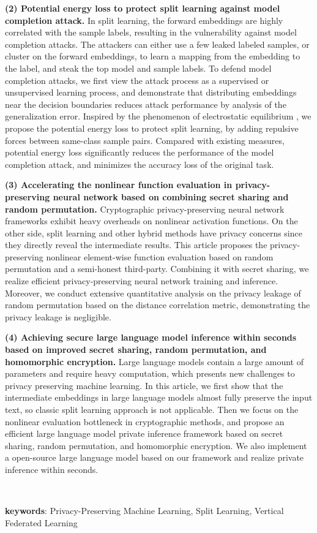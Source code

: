 \textbf{(2) Potential energy loss to protect split learning against model completion attack.}
In split learning, the forward embeddings are highly correlated with the sample labels, resulting in the vulnerability against model completion attacks.
%
The attackers can either use a few leaked labeled samples, or cluster on the forward embeddings, to learn a mapping from the embedding to the label, and steak the top model and sample labels.
%
To defend model completion attacks, we first view the attack process as a supervised or unsupervised learning process, and demonstrate that distributing embeddings near the decision boundaries reduces attack performance by analysis of the generalization error.
%
Inspired by the phenomenon of electrostatic equilibrium , we propose the potential energy loss to protect split learning, by adding repulsive forces between same-class sample pairs.
%
Compared with existing measures, potential energy loss significantly reduces the performance of the model completion attack, and minimizes the accuracy loss of the original task.


\textbf{(3) Accelerating the nonlinear function evaluation in privacy-preserving neural network based on combining secret sharing and random permutation.}
Cryptographic privacy-preserving neural network frameworks exhibit heavy overheads on nonlinear activation functions.
On the other side, split learning and other hybrid methods have privacy concerns since they directly reveal the intermediate results.
%
This article proposes the privacy-preserving nonlinear element-wise function evaluation based on random permutation and a semi-honest third-party.
%
Combining it with secret sharing, we realize efficient privacy-preserving neural network training and inference.
%
Moreover, we conduct extensive quantitative analysis on the privacy leakage of random permutation based on the distance correlation metric, demonstrating the privacy leakage is negligible.

\textbf{(4) Achieving secure large language model inference within seconds based on improved secret sharing, random permutation, and homomorphic encryption.}
Large language models contain a large amount of parameters and require heavy computation, which presents new challenges to privacy preserving machine learning.
%
In this article, we first show that the intermediate embeddings in large language models almost fully preserve the input text, so classic split learning approach is not applicable.
%
Then we focus on the nonlinear evaluation bottleneck in cryptographic methods, and propose an efficient large language model private inference framework based on secret sharing, random permutation, and homomorphic encryption.
%
We also implement a open-source large language model based on our framework and realize private inference within seconds.
%

~

\noindent \textbf{keywords}: Privacy-Preserving Machine Learning, Split Learning, Vertical Federated Learning